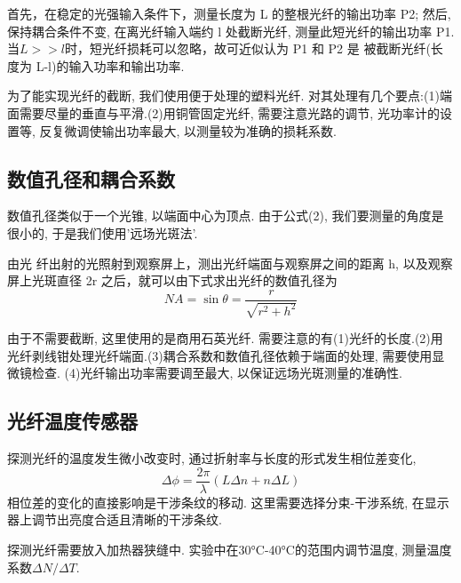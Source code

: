 \documentclass[12pt,a4paper]{article}
\begin{document}
首先，在稳定的光强输入条件下，测量长度为
L 的整根光纤的输出功率 P2; 然后, 保持耦合条件不变, 在离光纤输入端约 l 处截断光纤, 
测量此短光纤的输出功率 P1. 当$L>>l$时，短光纤损耗可以忽略，故可近似认为 P1 和 P2 是
被截断光纤(长度为 L-l)的输入功率和输出功率. 

为了能实现光纤的截断, 我们使用便于处理的塑料光纤. 对其处理有几个要点:(1)端面需要尽量的垂直与平滑.(2)用铜管固定光纤, 需要注意光路的调节, 光功率计的设置等, 
反复微调使输出功率最大, 以测量较为准确的损耗系数. 

\subsection{数值孔径和耦合系数}
数值孔径类似于一个光锥, 以端面中心为顶点. 由于公式(2), 我们要测量的角度是很小的, 于是我们使用'远场光斑法'. 

由光
纤出射的光照射到观察屏上，测出光纤端面与观察屏之间的距离 h, 以及观察屏上光斑直径
2r 之后，就可以由下式求出光纤的数值孔径为
$$NA=\sin{\theta}=\frac{r}{\sqrt{r^2+h^2}}$$

由于不需要截断, 这里使用的是商用石英光纤. 需要注意的有(1)光纤的长度.(2)用光纤剥线钳处理光纤端面.(3)耦合系数和数值孔径依赖于端面的处理, 需要使用显微镜检查.
(4)光纤输出功率需要调至最大, 以保证远场光斑测量的准确性. 
\subsection{光纤温度传感器}
探测光纤的温度发生微小改变时, 通过折射率与长度的形式发生相位差变化, 
$$\Delta \phi=\frac{2\pi}{\lambda}(L\Delta n + n \Delta L)$$
相位差的变化的直接影响是干涉条纹的移动. 这里需要选择分束-干涉系统, 在显示器上调节出亮度合适且清晰的干涉条纹.

探测光纤需要放入加热器狭缝中. 实验中在30°C-40°C的范围内调节温度, 测量温度系数$\Delta N/\Delta T$.
\end{document}
